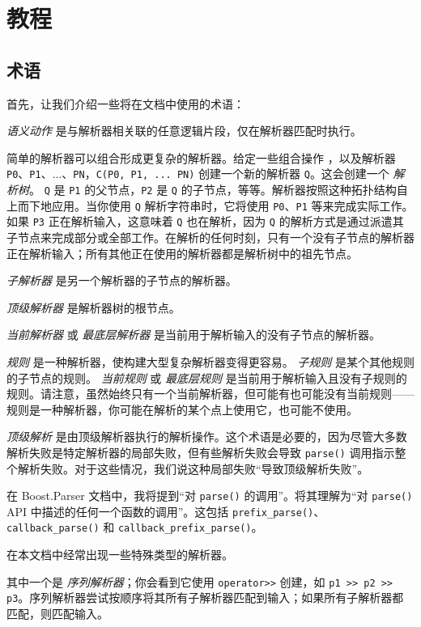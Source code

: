 \chapter{教程}
\section{术语}

首先，让我们介绍一些将在文档中使用的术语：

\emph{语义动作} 是与解析器相关联的任意逻辑片段，仅在解析器匹配时执行。

简单的解析器可以组合形成更复杂的解析器。给定一些组合操作 ，以及解析器 \texttt{P0}、\texttt{P1}、...、\texttt{PN}，\texttt{C(P0, P1, ... PN)} 创建一个新的解析器 \texttt{Q}。这会创建一个 \emph{解析树}。 \texttt{Q} 是 \texttt{P1} 的父节点，\texttt{P2} 是 \texttt{Q} 的子节点，等等。解析器按照这种拓扑结构自上而下地应用。当你使用 \texttt{Q} 解析字符串时，它将使用 \texttt{P0}、\texttt{P1} 等来完成实际工作。如果 \texttt{P3} 正在解析输入，这意味着 \texttt{Q} 也在解析，因为 \texttt{Q} 的解析方式是通过派遣其子节点来完成部分或全部工作。在解析的任何时刻，只有一个没有子节点的解析器正在解析输入；所有其他正在使用的解析器都是解析树中的祖先节点。

\emph{子解析器} 是另一个解析器的子节点的解析器。

\emph{顶级解析器} 是解析器树的根节点。

\emph{当前解析器} 或 \emph{最底层解析器} 是当前用于解析输入的没有子节点的解析器。

\emph{规则} 是一种解析器，使构建大型复杂解析器变得更容易。 \emph{子规则} 是某个其他规则的子节点的规则。 \emph{当前规则} 或 \emph{最底层规则} 是当前用于解析输入且没有子规则的规则。请注意，虽然始终只有一个当前解析器，但可能有也可能没有当前规则——规则是一种解析器，你可能在解析的某个点上使用它，也可能不使用。

\emph{顶级解析} 是由顶级解析器执行的解析操作。这个术语是必要的，因为尽管大多数解析失败是特定解析器的局部失败，但有些解析失败会导致 \texttt{parse()} 调用指示整个解析失败。对于这些情况，我们说这种局部失败“导致顶级解析失败”。

在 Boost.Parser 文档中，我将提到“对 \texttt{parse()} 的调用”。将其理解为“对 \texttt{parse()} API 中描述的任何一个函数的调用”。这包括 \texttt{prefix\_parse()}、\texttt{callback\_parse()} 和 \texttt{callback\_prefix\_parse()}。

在本文档中经常出现一些特殊类型的解析器。

其中一个是 \emph{序列解析器}；你会看到它使用 \texttt{operator>>} 创建，如 \texttt{p1 >> p2 >> p3}。序列解析器尝试按顺序将其所有子解析器匹配到输入；如果所有子解析器都匹配，则匹配输入。

